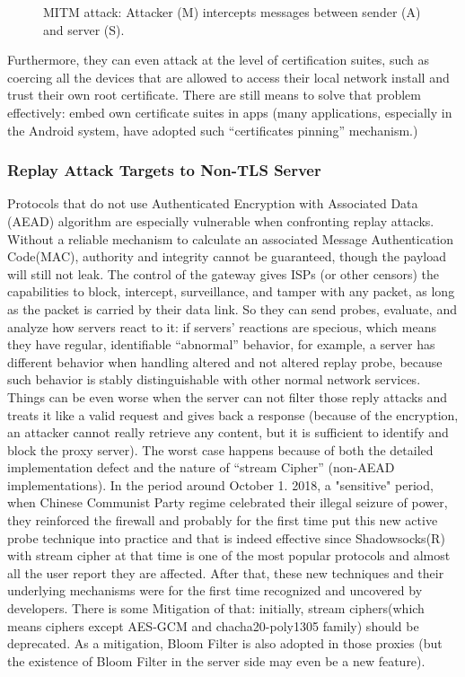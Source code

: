 \documentclass[conference]{IEEEtran}
\begin{document}
\begin{figure}[!h]
\centering

\caption{MITM attack: Attacker (M) intercepts messages between sender (A) and server (S).}
\label{fig:mitm}
\end{figure}

Furthermore, they can even attack at the level of certification suites, such as coercing all the devices that are allowed to access their local network install and trust their own root certificate. There are still means to solve that problem effectively: embed own certificate suites in apps (many applications, especially in the Android system, have adopted such “certificates pinning” mechanism.)

\subsubsection{Replay Attack Targets to Non-TLS Server}
Protocols that do not use Authenticated Encryption with Associated Data (AEAD) algorithm are especially vulnerable when confronting replay attacks. Without a reliable mechanism to calculate an associated Message Authentication Code(MAC), authority and integrity cannot be guaranteed, though the payload will still not leak.
The control of the gateway gives ISPs (or other censors) the capabilities to block, intercept, surveillance, and tamper with any packet, as long as the packet is carried by their data link. So they can send probes, evaluate, and analyze how servers react to it: if servers’ reactions are specious, which means they have regular, identifiable “abnormal” behavior, for example, a server has different behavior when handling altered and not altered replay probe, because such behavior is stably distinguishable with other normal network services. Things can be even worse when the server can not filter those reply attacks and treats it like a valid request and gives back a response (because of the encryption, an attacker cannot really retrieve any content, but it is sufficient to identify and block the proxy server)\cite{Active_Probing}. The worst case happens because of both the detailed implementation defect and the nature of “stream Cipher” (non-AEAD implementations).
In the period around October 1. 2018, a "sensitive" period, when Chinese Communist Party regime celebrated their illegal seizure of power, they reinforced the firewall and probably for the first time put this new active probe technique into practice and that is indeed effective since Shadowsocks(R) with stream cipher at that time is one of the most popular protocols and almost all the user report they are affected. After that, these new techniques and their underlying mechanisms were for the first time recognized and uncovered by developers.
There is some Mitigation of that: initially, stream ciphers(which means ciphers except AES-GCM and chacha20-poly1305 family) should be deprecated. As a mitigation, Bloom Filter is also adopted in those proxies (but the existence of Bloom Filter in the server side may even be a new feature).
\end{document}
